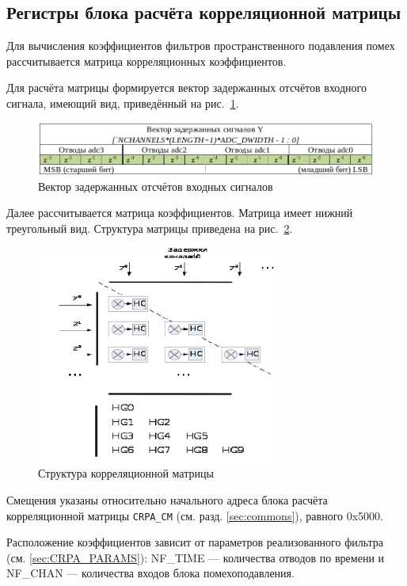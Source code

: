 \subsection{Регистры блока расчёта корреляционной матрицы}
\label{sec:CRPA_CM}

Для вычисления коэффициентов фильтров пространственного подавления помех рассчитывается
матрица корреляционных коэффициентов.

Для расчёта матрицы формируется вектор задержанных отсчётов входного сигнала, имеющий вид,
приведённый на рис.~\ref{fig:CRPA_CM_delay_line}. 
\begin{figure}
  \centering
  \includegraphics[width=12cm]{CRPA_CM_delay_line.png}
  \caption{Вектор задержанных отсчётов входных сигналов}
  \label{fig:CRPA_CM_delay_line}
\end{figure}

Далее рассчитывается матрица коэффициентов. Матрица имеет нижний треугольный
вид. Структура матрицы приведена на рис.~\ref{fig:CRPA_CM_struct}.
\begin{figure}
  \centering
  \includegraphics[width=8cm]{CRPA_CM_struct.png}
  \caption{Структура корреляционной матрицы}
  \label{fig:CRPA_CM_struct}
\end{figure}

Смещения указаны относительно начального адреса блока расчёта корреляционной матрицы
\texttt{CRPA\_CM} (см. разд. \ref{sec:commons}), равного 0x5000.

Расположение коэффициентов зависит от параметров реализованного фильтра
(см. \ref{sec:CRPA_PARAMS}): NF\_TIME --- количества отводов по времени и NF\_CHAN ---
количества входов блока помехоподавления.

